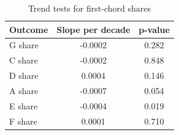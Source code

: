 \begin{table}[H]
\centering
\caption{Trend tests for first-chord shares}
\label{tab:chord_trends}
\begin{tabular}{lcc}
\toprule
Outcome & Slope per decade & p-value \\
\midrule
G share & -0.0002 & 0.282 \\
C share & -0.0002 & 0.848 \\
D share & 0.0004 & 0.146 \\
A share & -0.0007 & 0.054 \\
E share & -0.0004 & 0.019 \\
F share & 0.0001 & 0.710 \\
\bottomrule
\end{tabular}
\end{table}
